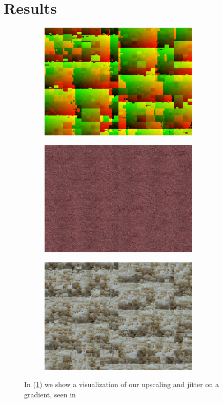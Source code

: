 \documentclass[12pt]{article}
\begin{document}
    \section{Results}
        \begin{figure}[H]
            \centering
            \begin{subfigure}
                \centering
                \includegraphics[width=3in]{result0.png}
                \caption{}
                \label{fig:visual}
            \end{subfigure}
            \begin{subfigure}
                \centering
                \includegraphics[width=3in]{result1.png}
                \caption{}
                \label{fig:stoch}
            \end{subfigure}
            \begin{subfigure}
                \centering
                \includegraphics[width=3in]{result2.png}
                \caption{}
                \label{fig:toroid}
            \end{subfigure}
            \caption{In (\ref{fig:visual}) we show a visualization of our upscaling and jitter on a gradient, seen in} %
        \end{figure}
\end{document}
